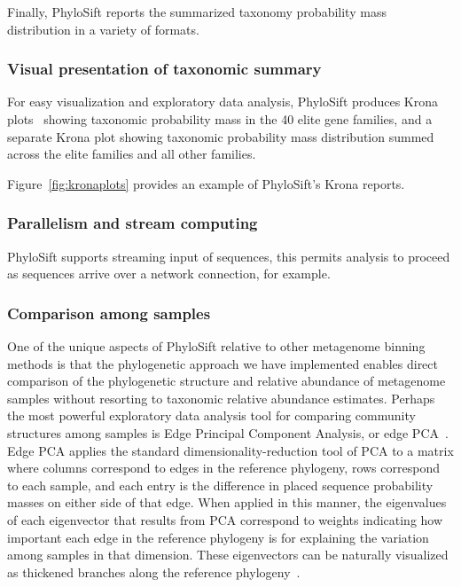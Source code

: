 \documentclass[10pt]{article}
\begin{document}
Finally, PhyloSift reports the summarized taxonomy probability mass distribution in a variety of formats.

\subsubsection*{Visual presentation of taxonomic summary}

For easy visualization and exploratory data analysis, PhyloSift produces Krona plots~\cite{Ondov2011} showing taxonomic probability mass in the 40 elite gene families, and a separate Krona plot showing taxonomic probability mass distribution summed across the elite families and all other families.

Figure~\ref{fig:kronaplots} provides an example of PhyloSift's Krona reports.

\subsubsection*{Parallelism and stream computing}

PhyloSift supports streaming input of sequences, this permits analysis to proceed as sequences arrive over a network connection, for example.

\subsubsection*{Comparison among samples}

One of the unique aspects of PhyloSift relative to other metagenome binning methods is that the phylogenetic approach we have implemented enables direct comparison of the phylogenetic structure and relative abundance of metagenome samples without resorting to taxonomic relative abundance estimates.
Perhaps the most powerful exploratory data analysis tool for comparing community structures among samples is Edge Principal Component Analysis, or edge PCA~\cite{Matsen2012}.
Edge PCA applies the standard dimensionality-reduction tool of PCA to a matrix where columns correspond to edges in the reference phylogeny, rows correspond to each sample, and each entry is the difference in placed sequence probability masses on either side of that edge.
When applied in this manner, the eigenvalues of each eigenvector that results from PCA correspond to weights indicating how important each edge in the reference phylogeny is for explaining the variation among samples in that dimension.
These eigenvectors can be naturally visualized as thickened branches along the reference phylogeny~\cite{Matsen2012}.
\end{document}
